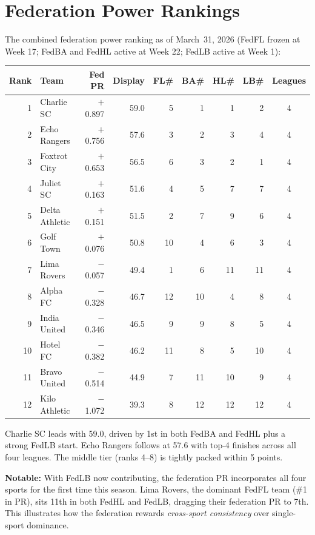 \documentclass[11pt,a4paper]{article}
\begin{document}
\section{Federation Power Rankings}

The combined federation power ranking as of March~31, 2026 (FedFL frozen at Week 17; FedBA and FedHL active at Week 22; FedLB active at Week 1):

\begin{table}[H]
\centering
\begin{tabular}{@{}rl r r r r r r c@{}}
\toprule
\textbf{Rank} & \textbf{Team} & \textbf{Fed PR} & \textbf{Display} & \textbf{FL\#} & \textbf{BA\#} & \textbf{HL\#} & \textbf{LB\#} & \textbf{Leagues}\\
\midrule
\rowcolor{tablealt}
1 & Charlie SC & $+$0.897 & 59.0 & 5 & 1 & 1 & 2 & 4\\
2 & Echo Rangers & $+$0.756 & 57.6 & 3 & 2 & 3 & 4 & 4\\
3 & Foxtrot City & $+$0.653 & 56.5 & 6 & 3 & 2 & 1 & 4\\
4 & Juliet SC & $+$0.163 & 51.6 & 4 & 5 & 7 & 7 & 4\\
5 & Delta Athletic & $+$0.151 & 51.5 & 2 & 7 & 9 & 6 & 4\\
6 & Golf Town & $+$0.076 & 50.8 & 10 & 4 & 6 & 3 & 4\\
7 & Lima Rovers & $-$0.057 & 49.4 & 1 & 6 & 11 & 11 & 4\\
8 & Alpha FC & $-$0.328 & 46.7 & 12 & 10 & 4 & 8 & 4\\
9 & India United & $-$0.346 & 46.5 & 9 & 9 & 8 & 5 & 4\\
10 & Hotel FC & $-$0.382 & 46.2 & 11 & 8 & 5 & 10 & 4\\
11 & Bravo United & $-$0.514 & 44.9 & 7 & 11 & 10 & 9 & 4\\
12 & Kilo Athletic & $-$1.072 & 39.3 & 8 & 12 & 12 & 12 & 4\\
\bottomrule
\end{tabular}
\end{table}

Charlie SC leads with 59.0, driven by 1st in both FedBA and FedHL plus a strong FedLB start. Echo Rangers follows at 57.6 with top-4 finishes across all four leagues. The middle tier (ranks 4--8) is tightly packed within 5 points.

\textbf{Notable:} With FedLB now contributing, the federation PR incorporates all four sports for the first time this season. Lima Rovers, the dominant FedFL team (\#1 in PR), sits 11th in both FedHL and FedLB, dragging their federation PR to 7th. This illustrates how the federation rewards \emph{cross-sport consistency} over single-sport dominance.
\end{document}
